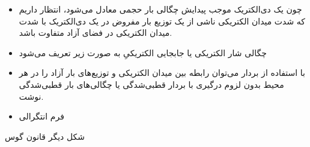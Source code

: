 \begin{ELunit}


\begin{itemize}
\tightlist
\item
  چون یک دی‌الکتریک موجب پیدایش چگالی بار حجمی معادل  می‌شود، انتظار داریم که شدت میدان الکتریکی ناشی از یک توزیع بار مفروض در یک دی‌الکتریک با شدت میدان الکتریکی در فضای آزاد متفاوت باشد.
\end{itemize}


\end{ELunit}

\begin{ELjoin}

\begin{itemize}
\tightlist
\item
  چگالی شار الکتریکی یا جابجایی الکتریکیِ  به صورت زیر تعریف می‌شود
\end{itemize}

\begin{ELdefinition}{}


\end{ELdefinition}

\end{ELjoin}

\begin{ELunit}

\begin{itemize}
\tightlist
\item
  با استفاده از بردار  می‌توان رابطه بین میدان الکتریکی و توزیع‌های بار آزاد را در هر محیط بدون لزوم درگیری با بردار قطبی‌شدگی  یا چگالی‌های بار قطبی‌شدگی نوشت.
\end{itemize}

\end{ELunit}

\begin{ELimportant}{}


\end{ELimportant}

\begin{ELjoin}

\begin{itemize}
\tightlist
\item
  فرم انتگرالی
\end{itemize}


\begin{ELimportant}{شکل دیگر قانون گوس}


\end{ELimportant}

\end{ELjoin}

